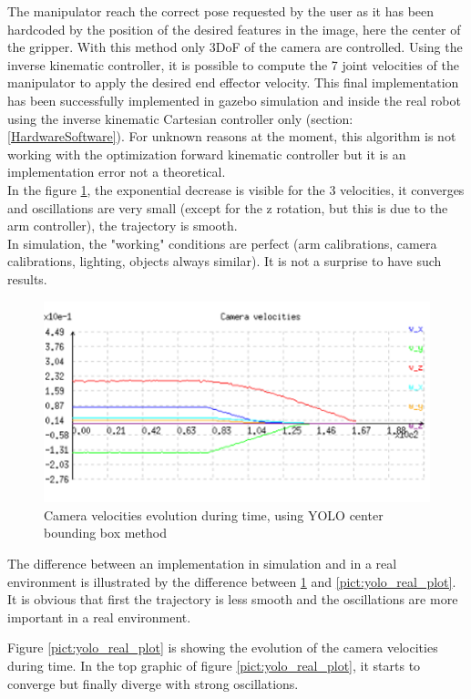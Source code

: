 The manipulator reach the correct pose requested by the user as it has been hardcoded by the position of the desired features in the image, here the center of the gripper. With this method only 3DoF of the camera are controlled. Using the inverse kinematic controller, it is possible to compute the 7 joint velocities of the manipulator to apply the desired end effector velocity. This final implementation has been successfully implemented  in gazebo simulation and inside the real robot using the inverse kinematic Cartesian controller only (section:\ref{HardwareSoftware}). For unknown reasons at the moment, this algorithm is not working with the optimization forward kinematic controller but it is an implementation error not a theoretical. \\

In the figure \ref{pict:yolo_simulation_plot}, the exponential decrease is visible for the 3 velocities, it converges  and oscillations are very small (except for the z rotation, but this is due to the arm controller), the trajectory is smooth. \\

In simulation, the "working" conditions are perfect (arm calibrations, camera calibrations, lighting, objects always similar). It is not a surprise to have such results.
\newpage
\begin{figure} [!h]
    \centering
    \includegraphics[width=0.6\linewidth]{images/yolo_plot_simulation.png}
    \caption{Camera velocities evolution during time, using YOLO center bounding box method}
    \label{pict:yolo_simulation_plot}
\end{figure}

The difference between an implementation in simulation and in a real environment is illustrated by the difference between \ref{pict:yolo_simulation_plot} and \ref{pict:yolo_real_plot}. It is obvious that first the trajectory is less smooth and the oscillations are more important in a real environment. 

Figure \ref{pict:yolo_real_plot} is showing the evolution of the camera velocities during time. In the top graphic of figure \ref{pict:yolo_real_plot}, it starts to converge but finally diverge with strong oscillations. \\


